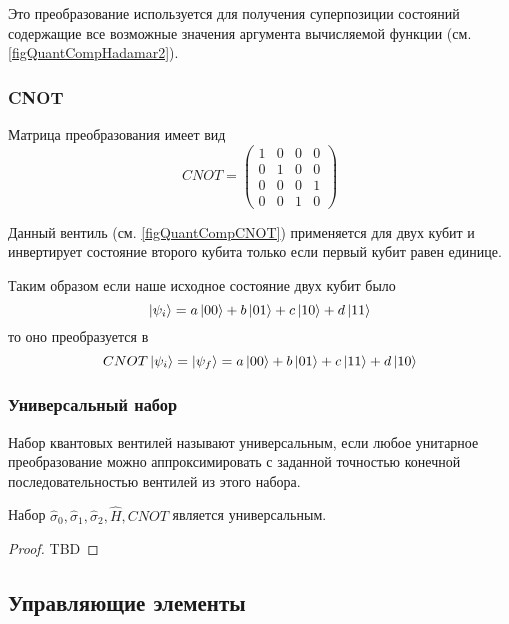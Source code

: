 

Это преобразование используется для получения суперпозиции состояний
содержащие все возможные значения аргумента вычисляемой функции
(см. \autoref{figQuantCompHadamar2}). 



\subsubsection{CNOT}

Матрица преобразования имеет вид
\[
CNOT=\begin{pmatrix}
1 & 0 & 0 & 0 \\
0 & 1 & 0 & 0 \\
0 & 0 & 0 & 1 \\
0 & 0 & 1 & 0 
\end{pmatrix}
\]

Данный вентиль (см. \autoref{figQuantCompCNOT}) применяется для двух
кубит и инвертирует состояние 
второго кубита только если первый кубит равен единице.



Таким образом если наше исходное состояние двух кубит было 
\[
\ket{\psi_i} = a \ket{00} + b \ket{01} + c \ket{10} + d \ket{11}
\]
то оно преобразуется в 
\[
CNOT \ket{\psi_i} = \ket{\psi_f} = 
a \ket{00} + b \ket{01} + c \ket{11} + d \ket{10}
\]

\subsubsection{Универсальный набор}

\begin{definition}
Набор квантовых вентилей называют универсальным, если любое унитарное
преобразование можно аппроксимировать с заданной точностью конечной
последовательностью вентилей из этого набора. 
\end{definition}

\begin{theorem}[Китаев]
Набор $\hat{\sigma}_0, \hat{\sigma}_1,
\hat{\sigma}_2, \hat{H}, CNOT$ является универсальным.
\begin{proof}
TBD
\end{proof}
\end{theorem}


\subsection{Управляющие элементы}





 


